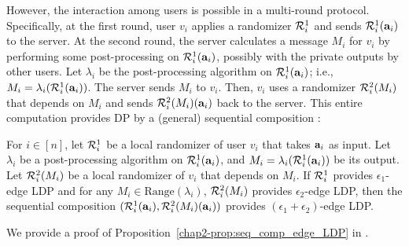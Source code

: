 However, the interaction 
among users 
is possible in a multi-round protocol. 
Specifically, 
at the first round, 
user $v_i$ applies a randomizer $\mathcal{R}_i^1$ and 
sends $\mathcal{R}_i^1(\mathbf{a}_i)$ to the server. 
At the second round, the server 
calculates a message $M_i$ for $v_i$ by 
performing 
some post-processing on $\mathcal{R}_i^1(\mathbf{a}_i)$, possibly with the private outputs by other users. 
Let $\lambda_i$ be the post-processing algorithm on $\mathcal{R}_i^1(\mathbf{a}_i)$; 
i.e., $M_i = \lambda_i(\mathcal{R}_i^1(\mathbf{a}_i))$. 
The server sends $M_i$ to $v_i$. 
Then, $v_i$ uses a randomizer $\mathcal{R}_i^2(M_i)$ that depends on $M_i$ and sends $\mathcal{R}_i^2(M_i)(\mathbf{a}_i)$ back to the server.
This entire computation 
provides 
DP by 
a (general) sequential composition \cite{DP_Li}: 

\begin{proposition}  
\label{chap2-prop:seq_comp_edge_LDP} 
  For 
  $i \in [n]$, let 
  $\mathcal{R}_i^1$ be a local randomizer of user $v_i$ that takes $\mathbf{a}_i$ as input. 
  Let $\lambda_i$ be a post-processing algorithm on $\mathcal{R}_i^1(\mathbf{a}_i)$, and $M_i = \lambda_i(\mathcal{R}_i^1(\mathbf{a}_i))$ be its output. 
  Let $\mathcal{R}_i^2(M_i)$ be a local randomizer of $v_i$ that depends on $M_i$. 
  If $\mathcal{R}_i^1$ provides $\epsilon_1$-edge LDP and for any 
  $M_i \in \mathrm{Range}(\lambda_i)$,
  $\mathcal{R}_i^2(M_i)$ provides $\epsilon_2$-edge LDP, 
then the sequential composition 
$(\mathcal{R}_i^1(\mathbf{a}_i), \mathcal{R}_i^2(M_i)(\mathbf{a}_i))$
provides $(\epsilon_1 + \epsilon_2)$-edge LDP.
\end{proposition}
We provide a proof of Proposition~\ref{chap2-prop:seq_comp_edge_LDP} in .

